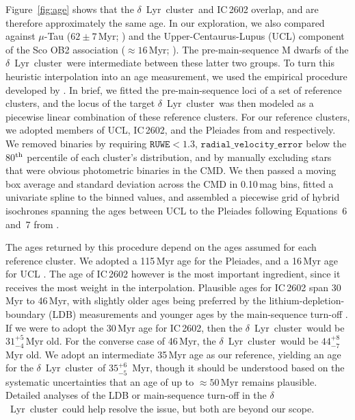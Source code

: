 \documentclass[12pt,modern,twocolumn,tighten]{aastex63}
\newcommand{\cn}{$\delta$\ Lyr\ cluster} %
\begin{document}
Figure~\ref{fig:age} shows that the \cn\ and IC\,2602 overlap, and are
therefore approximately the same age.  In our exploration, we also
compared against $\mu$-Tau ($62\pm7$\,Myr; \citealt{gagne_mutau_2020})
and the Upper-Centaurus-Lupus (UCL) component of the Sco OB2
association ($\approx$$16$\,Myr; \citealt{pecaut_star_2016}).  The
pre-main-sequence M dwarfs of the \cn\ were intermediate between these
latter two groups.  To turn this heuristic interpolation into an
age measurement, we used the empirical procedure
developed by \citet{gagne_mutau_2020}.  In brief, we fitted the
pre-main-sequence loci of a set of reference clusters, and the locus
of the target \cn\ was then modeled as a piecewise linear combination
of these reference clusters.  For our reference clusters, we adopted
members of UCL, IC\,2602, and the Pleiades from
\citet{damiani_stellar_2019} and \cite{CantatGaudin2018a}
respectively.  We removed binaries by requiring $\texttt{RUWE}<1.3$,
$\texttt{radial\_velocity\_error}$ below the 80$^{\rm th}$ percentile
of each cluster's distribution, and by manually excluding stars that
were obvious photometric binaries in the CMD.  We then passed a moving
box average and standard deviation across the CMD in 0.10\,mag bins,
fitted a univariate spline to the binned values, and assembled a
piecewise grid of hybrid isochrones spanning the ages between UCL to
the Pleiades following Equations~6 and~7 from
\citet{gagne_mutau_2020}.  

The ages returned by this procedure depend on the ages assumed for
each reference cluster.  We adopted a 115\,Myr age for the Pleiades,
and a 16\,Myr age for UCL \citep{dahm_2015,pecaut_star_2016}.
The age of IC\,2602 however is the most important
ingredient, since it receives the most weight in the interpolation.
Plausible ages for IC\,2602
span 30\,Myr to 46\,Myr, with slightly older ages being preferred by
the lithium-depletion-boundary (LDB) measurements and younger ages by
the main-sequence turn-off
\citep{stauffer_rotational_1997,dobbie_ic_2010,david_ages_2015,randich_gaiaeso_2018,bossini_age_2019,bouma_cluster_2020}.
If we were to adopt the 30\,Myr age for IC\,2602, then the \cn\ would
be $31^{+5}_{-4}$\,Myr old.  For the converse case of 46\,Myr, the
\cn\ would be $44^{+8}_{-7}$\,Myr old.  We adopt an intermediate
35\,Myr age as our reference, yielding an age for the \cn\ of
$35^{+6}_{-5}$\, Myr, though it should be understood based on the
systematic uncertainties that an age of up to $\approx50$\,Myr remains
plausible.  Detailed analyses of the LDB or main-sequence turn-off in
the \cn\ could help resolve the issue, but both are beyond our scope.
\end{document}
